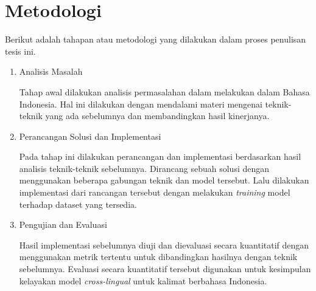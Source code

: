 \section{Metodologi}

Berikut adalah tahapan atau metodologi yang dilakukan dalam proses penulisan tesis ini.

\begin{enumerate}
  \item Analisis Masalah

  Tahap awal dilakukan analisis permasalahan dalam melakukan \amrparsing{} dalam Bahasa Indonesia.
  Hal ini dilakukan dengan mendalami materi mengenai teknik-teknik \amrparsing{} yang ada sebelumnya dan membandingkan hasil kinerjanya.

  \item Perancangan Solusi dan Implementasi

  Pada tahap ini dilakukan perancangan dan implementasi berdasarkan hasil analisis teknik-teknik \amrparsing{} sebelumnya.
  Dirancang sebuah solusi dengan menggunakan beberapa gabungan teknik dan model tersebut.
  Lalu dilakukan implementasi dari rancangan tersebut dengan melakukan \textit{training} model terhadap dataset yang tersedia.

  \item Pengujian dan Evaluasi

  Hasil implementasi sebelumnya diuji dan dievaluasi secara kuantitatif dengan menggunakan metrik tertentu untuk dibandingkan hasilnya dengan teknik sebelumnya.
  Evaluasi secara kuantitatif
  tersebut digunakan untuk kesimpulan kelayakan model \amrparsing{} \textit{cross-lingual} untuk kalimat berbahasa Indonesia.

\end{enumerate}
